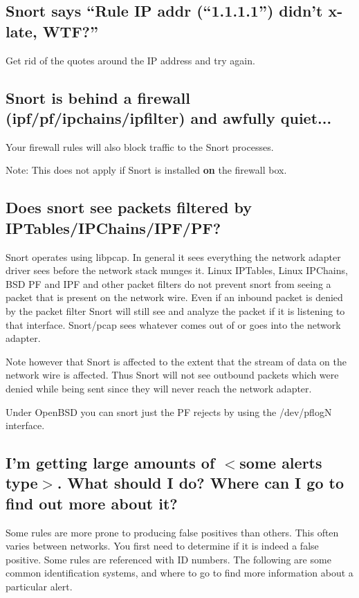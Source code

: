 \documentclass{article}
\begin{document}
\subsection{Snort says ``Rule IP addr (``1.1.1.1'') didn't x-late, WTF?''}

Get rid of the quotes around the IP address and try again.

\subsection{Snort is behind a firewall (ipf/pf/ipchains/ipfilter) and awfully quiet...}

Your firewall rules will also block traffic to the Snort processes.

Note: This does not apply if Snort is installed {\bf on} the firewall box.

\subsection{Does snort see packets filtered by IPTables/IPChains/IPF/PF?}

Snort operates using libpcap. In general it sees everything the network adapter
driver sees before the network stack munges it. Linux IPTables, Linux IPChains,
BSD PF and IPF and other packet filters do not prevent snort from seeing a
packet that is present on the network wire. Even if an inbound packet is denied
by the packet filter Snort will still see and analyze the packet if it is
listening to that interface. Snort/pcap sees whatever comes out of or goes into
the network adapter.

Note however that Snort is affected to the extent that the stream of data on
the network wire is affected. Thus Snort will not see outbound packets which
were denied while being sent since they will never reach the network adapter.

Under OpenBSD you can snort just the PF rejects by using the /dev/pflogN
interface.

\subsection{I'm getting large amounts of $<$some alerts type$>$. What should I do?  Where can I go to find out more about it? }

Some rules are more prone to producing false positives than others.     
This often varies between networks.  You first need to determine if it
is indeed a false positive.  Some rules are referenced with ID numbers.
The following are some common identification systems, and where to go
to find more information about a particular alert.
\end{document}
